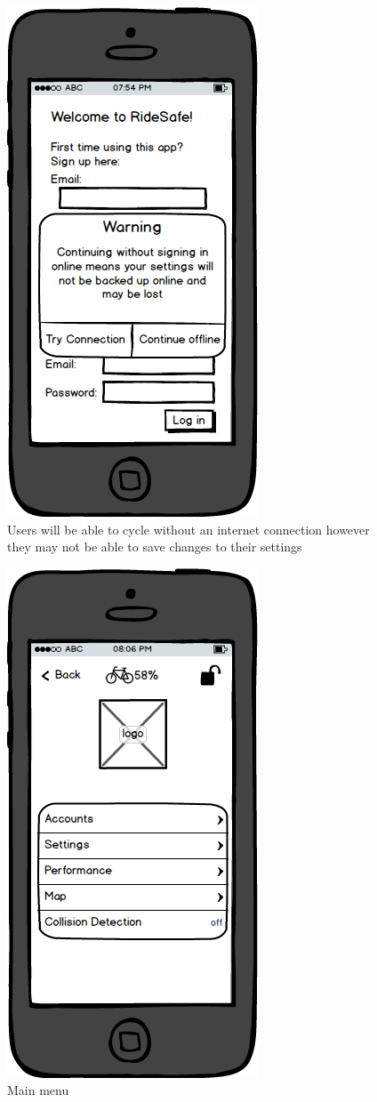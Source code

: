 \documentclass[a4paper]{report}
\begin{document}
\clearpage
\begin{figure}
\centering
\includegraphics[scale=0.9]{figures/prototype_2/offline_warn}
\caption{Users will be able to cycle without an internet connection however they may not be able to save changes to their settings}
\end{figure}
\clearpage
\begin{figure}
\centering
\includegraphics[scale=0.9]{figures/prototype_2/main}
\caption{Main menu}
\end{figure}
\end{document}
